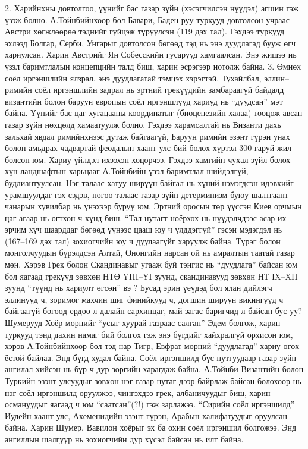 2. Харийнхны довтолгоо, үүнийг бас газар зүйн (хэсэгчилсэн нүүдэл) агшин гэж үзэж болно. А.Тойнбийнхоор бол Бавари, Баден руу туркууд довтолсон учраас Австри хөгжлөөрөө тэднийг гүйцэж түрүүлсэн (119 дэх тал). Гэхдээ туркууд эхлээд Болгар, Серби, Унгарыг довтолсон бөгөөд тэд нь энэ дуудлагад бууж өгч хариулсан. Харин Австрийг Ян Собесскийн гусарууд хамгаалсан. Энэ жишээ нь үзэл баримтлалын концепцийн талд биш, харин эсрэгээр нотолж байна.
3. Өмнөх соёл иргэншлийн ялзрал, энэ дуудлагатай тэмцэх хэрэгтэй. Тухайлбал, эллин–римийн соёл иргэншлийн задрал нь эртний грекүүдийн замбараагүй байдалд византийн болон баруун европын соёл иргэншлүүд хариуд нь “дуудсан” мэт байна. Үүнийг бас цаг хугацааны координатыг (биоценезийн халаа) тооцож авсан газар зүйн нөхцөлд хамаатуулж болно. Гэхдээ харамсалтай нь Византи дахь зальхай явдал римийнхнээс дутаж байгаагүй, Баруун римийн эзэнт гүрэн унах болон амьдрах чадвартай феодалын хаант улс бий болох хүртэл 300 гаруй жил болсон юм. Хариу үйлдэл ихээхэн хоцорчээ.
Гэхдээ хамгийн чухал зүйл болох хүн ландшафтын харьцааг А.Тойнбийн үзэл баримтлал шийдэлгүй, будлиантуулсан. Нэг талаас хатуу ширүүн байгал нь хүний нэмэгдсэн идэвхийг урамшуулдаг гэх сэдэв, нөгөө талаас газар зүйн детерминизм буюу шалтгаант чанарын хувилбар нь үнэхээр буруу юм. Эртний оросын төр үүссэн Киев орчмын цаг агаар нь огтхон ч хүнд биш. “Тал нутагт ноёрхох нь нүүдэлчдээс асар их эрчим хүч шаарддаг бөгөөд үүнээс цааш юу ч үлддэггүй” гэсэн мэдэгдэл нь (167–169 дэх тал) зохиогчийн юу ч дуулаагүйг харуулж байна. Түрэг болон монголчуудын бүрэлдсэн Алтай, Ононгийн нарсан ой нь амралтын таатай газар мөн. Хэрэв Грек болон Скандинавыг угааж буй тэнгис нь “дуудлага” байсан юм бол яагаад грекүүд зөвхөн НТӨ YIII–YI зуунд, скандинавууд зөвхөн НТ IX–XII зуунд “түүнд нь хариулт өгсөн” вэ ? Бусад эрин үеүдэд бол ялан дийлэгч эллинүүд ч, зоримог махчин шиг финийкууд ч, догшин ширүүн викингүүд ч байгаагүй бөгөөд ердөө л далайн сархинцаг, май загас баригчид л байсан бус уу? Шумерууд Хоёр мөрнийг “усыг хуурай газраас салган” Эдем болгож, харин туркууд тэнд дахин намаг бий болгох гэж энэ бүгдийг хайхралгүй орхисон юм, хэрэв А.Тойнбийнхоор бол тэд нар Тигр, Евфрат мөрний “дуудлагад” хариу өгөх ёстой байлаа. Энд бүгд худал байна.
Соёл иргэншилд бүс нутгуудаар газар зүйн ангилал хийсэн нь бүр ч дур зоргийн харагдаж байна. А.Тойнби Византийн болон Туркийн эзэнт улсуудыг зөвхөн нэг газар нутаг дээр байрлаж байсан болохоор нь нэг соёл иргэншилд оруулжээ, чингэхдээ грек, албаничуудыг биш, харин османуудыг яагаад ч юм “саатсан”(?!) гэж зарлажээ. “Сирийн соёл иргэншилд” Иудейн хаант улс, Ахеменидийн эзэнт гүрэн, Арабын халифатуудыг оруулсан байна. Харин Шумер, Вавилон хоёрыг эх ба охин соёл иргэншил болгожээ. Энд ангиллын шалгуур нь зохиогчийн дур хүсэл байсан нь илт байна.
